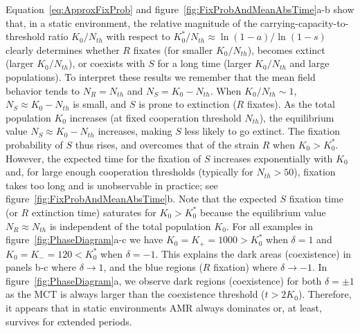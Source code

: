 \documentclass{article}
\begin{document}
Equation~\eqref{eq:ApproxFixProb} and figure~\ref{fig:FixProbAndMeanAbsTime}a-b show that, in a static environment, the relative magnitude of the carrying-capacity-to-threshold ratio \(K_0/N_{th}\) with respect to \(K_{0}^{*}/N_{th}\approx\ln{\left(1-a\right)}/\ln{\left(1-s\right)}\) clearly determines whether \(R\) fixates (for smaller \(K_0/N_{th}\)), becomes extinct (larger \(K_0/N_{th}\)), or coexists with \(S\) for a long time (larger \(K_0/N_{th}\) and large populations). To interpret these results we remember that the mean field behavior tends to \(N_R=N_{th}\) and \(N_S=K_{0}-N_{th}\). When \(K_0/N_{th} \sim 1\), \(N_S\approx K_0-N_{th}\) is small, and $S$ is prone to extinction (\(R\) fixates). As the total population \(K_0\) increases (at fixed cooperation threshold \(N_{th}\)), the equilibrium value \(N_S\approx K_0-N_{th}\) increases, making $S$ less likely to go extinct. The  fixation probability of $S$ thus rises, and overcomes that of the strain \(R\) when \(K_0>K_0^{*}\). However, the expected time for the fixation of \(S\) increases exponentially with \(K_0\) and, for large enough cooperation thresholds (typically for \(N_{th}>50\)), fixation takes too long and is unobservable in practice; see figure~\ref{fig:FixProbAndMeanAbsTime}b. Note that the expected \(S\) fixation time (or \(R\) extinction time) saturates for \(K_0>K_0^{*}\) because the equilibrium value \(N_R\approx N_{th}\) is independent of the total population \(K_0\). For all examples in figure~\ref{fig:PhaseDiagram}a-c we have \(K_0=K_{+}=1000>K_0^*\) when \(\delta=1\) and \(K_0=K_{-}=120<K_0^*\) when \(\delta=-1\). This explains the dark areas (coexistence) in panels b-c where $\delta \to 1$, and the blue regions ($R$ fixation) where $\delta \to -1$. In figure~\ref{fig:PhaseDiagram}a, we observe dark regions (coexistence) for both \(\delta=\pm1\) as the MCT is always larger than the coexistence threshold (\(t>2K_0\)). Therefore, it appears that in static environments AMR always dominates or, at least, survives for extended periods.
\end{document}

